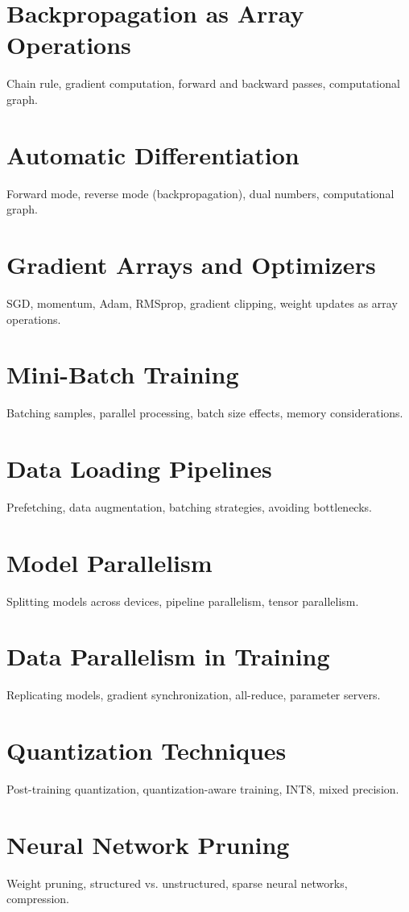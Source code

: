 \chapter{Backpropagation as Array Operations}
Chain rule, gradient computation, forward and backward passes, computational graph.

\chapter{Automatic Differentiation}
Forward mode, reverse mode (backpropagation), dual numbers, computational graph.

\chapter{Gradient Arrays and Optimizers}
SGD, momentum, Adam, RMSprop, gradient clipping, weight updates as array operations.

\chapter{Mini-Batch Training}
Batching samples, parallel processing, batch size effects, memory considerations.

\chapter{Data Loading Pipelines}
Prefetching, data augmentation, batching strategies, avoiding bottlenecks.

\chapter{Model Parallelism}
Splitting models across devices, pipeline parallelism, tensor parallelism.

\chapter{Data Parallelism in Training}
Replicating models, gradient synchronization, all-reduce, parameter servers.

\chapter{Quantization Techniques}
Post-training quantization, quantization-aware training, INT8, mixed precision.

\chapter{Neural Network Pruning}
Weight pruning, structured vs. unstructured, sparse neural networks, compression.

